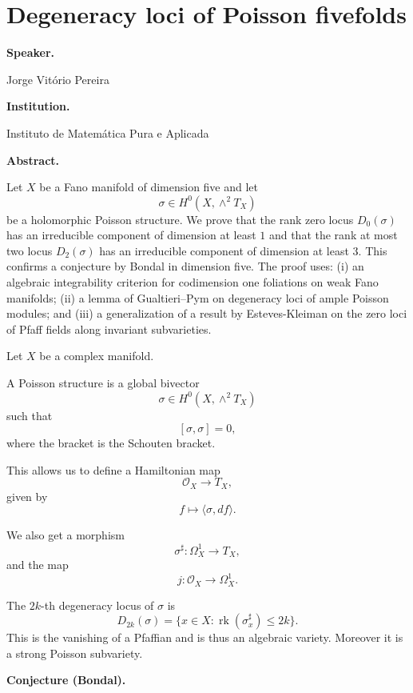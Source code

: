 \section{Degeneracy loci of Poisson
fivefolds}
\label{section-degeneracy-loci-poisson-
fivefolds}

\medskip\noindent
{\bf Speaker.}

Jorge Vit\'orio Pereira

\medskip\noindent
{\bf Institution.}

Instituto de Matem\'atica Pura e
Aplicada

\medskip\noindent
{\bf Abstract.}

Let $X$ be a Fano manifold of dimension
five and let
$$
\sigma\in H^0(X,\wedge^2 T_X)
$$
be a holomorphic Poisson structure.
We prove that the rank zero locus
$D_0(\sigma)$ has an irreducible
component of dimension at least $1$ and
that the rank at most two locus
$D_2(\sigma)$ has an irreducible
component of dimension at least $3$.
This confirms a conjecture by Bondal in
dimension five.
The proof uses:
(i) an algebraic integrability criterion
for codimension one foliations on weak
Fano manifolds;
(ii) a lemma of Gualtieri--Pym on
degeneracy loci of ample Poisson
modules; and
(iii) a generalization of a result by
Esteves-Kleiman on the zero loci of
Pfaff fields along invariant
subvarieties.


Let $X$ be a complex manifold.

\begin{definition}
\label{definition-poisson-structure}
A Poisson structure is a global
bivector
$$
\sigma\in H^0(X,\wedge^2 T_X)
$$
such that
$$
[\sigma,\sigma]=0,
$$
where the bracket is the Schouten
bracket.
\end{definition}

This allows us to define a Hamiltonian
map
$$
\mathcal O_X\to T_X,
$$
given by
$$
f\mapsto \langle \sigma,df\rangle.
$$

We also get a morphism
$$
\sigma^\sharp:\Omega_X^1\to T_X,
$$
and the map
$$
j:\mathcal O_X\to \Omega_X^1.
$$

\begin{definition}
\label{definition-degeneracy-locus}
The $2k$-th degeneracy locus of
$\sigma$ is
$$
D_{2k}(\sigma)
=
\{x\in X:\operatorname{rk}
(\sigma^\sharp_x)\leq 2k\}.
$$
This is the vanishing of a Pfaffian
and is thus an algebraic variety.
Moreover it is a strong Poisson
subvariety.
\end{definition}

\medskip\noindent
{\bf Conjecture (Bondal).}


